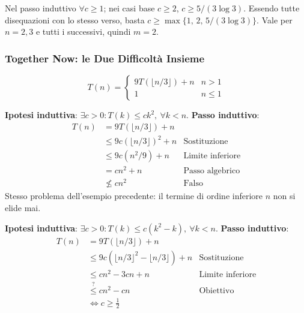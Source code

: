 \documentclass[12pt, a4paper]{article}
\begin{document}
\begin{tcolorbox}[colback=lightergray!5, colframe=tocsubsec, title=\textbf{Conclusione}]
Nel passo induttivo $\forall c\ge 1$; nei casi base $c\ge 2$, $c\ge 5/(3\log 3)$. Essendo tutte disequazioni con lo stesso verso, basta $c\ge\max\{1,\,2,\,5/(3\log 3)\}$. Vale per $n=2,3$ e tutti i successivi, quindi $m=2$.
\end{tcolorbox}

\subsubsection{Together Now: le Due Difficoltà Insieme}

$$T(n) = \begin{cases} 9T(\lfloor n/3\rfloor)+n & n>1 \\ 1 & n\le 1 \end{cases}$$

\begin{tcolorbox}[colback=lightergray!10, colframe=tocsec, title=\textbf{Primo Tentativo: $T(n)=O(n^2)$, Ipotesi Semplice}]
\textbf{Ipotesi induttiva}: $\exists c>0: T(k)\le ck^2,\ \forall k<n$. \textbf{Passo induttivo}:
\begin{align*}
T(n) &= 9T(\lfloor n/3\rfloor)+n \\
     &\le 9c(\lfloor n/3\rfloor)^2+n & \text{Sostituzione} \\
     &\le 9c(n^2/9)+n & \text{Limite inferiore} \\
     &= cn^2+n & \text{Passo algebrico} \\
     &\not\le cn^2 & \text{Falso}
\end{align*}
Stesso problema dell'esempio precedente: il termine di ordine inferiore $n$ non si elide mai.
\end{tcolorbox}

\begin{tcolorbox}[colback=lightergray!10, colframe=tocsec, title=\textbf{Secondo Tentativo: Ipotesi più Stretta}]
\textbf{Ipotesi induttiva}: $\exists c>0: T(k)\le c(k^2-k),\ \forall k<n$. \textbf{Passo induttivo}:
\begin{align*}
T(n) &= 9T(\lfloor n/3\rfloor)+n \\
     &\le 9c\left(\lfloor n/3\rfloor^2-\lfloor n/3\rfloor\right)+n & \text{Sostituzione} \\
     &\le cn^2-3cn+n & \text{Limite inferiore} \\
     &\overset{?}{\le} cn^2-cn & \text{Obiettivo} \\
     &\iff c\ge \frac{1}{2}
\end{align*}
\end{tcolorbox}
\end{document}
